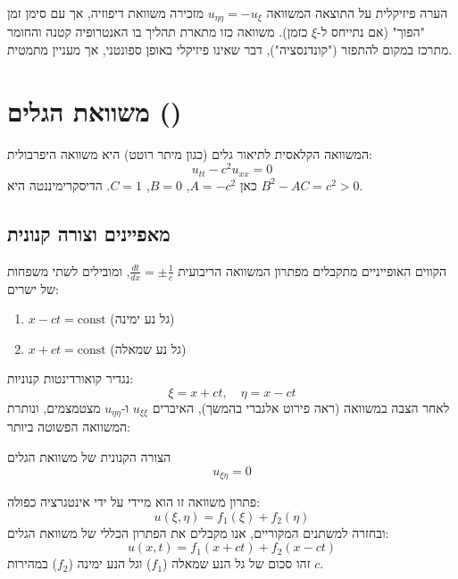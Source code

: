 \begin{notebox}{הערה פיזיקלית על התוצאה}
המשוואה $u_{\eta\eta} = -u_\xi$ מזכירה משוואת דיפוזיה, אך עם סימן זמן "הפוך" (אם נתייחס ל-$\xi$ כזמן). משוואה כזו מתארת תהליך בו האנטרופיה קטנה והחומר מתרכז במקום להתפזר ("קונדנסציה"), דבר שאינו פיזיקלי באופן ספונטני, אך מעניין מתמטית.
\end{notebox}

\section{משוואת הגלים ()}

המשוואה הקלאסית לתיאור גלים (כגון מיתר רוטט) היא משוואה היפרבולית:
$$ u_{tt} - c^2 u_{xx} = 0 $$
כאן $A = -c^2$, $B=0$, $C=1$. הדיסקרימיננטה היא $B^2 - AC = c^2 > 0$.

\subsection{מאפיינים וצורה קנונית}
הקווים האופייניים מתקבלים מפתרון המשוואה הריבועית $\frac{dt}{dx} = \pm \frac{1}{c}$, ומובילים לשתי משפחות של ישרים:
\begin{enumerate}
    \item $x - ct = \text{const}$ (גל נע ימינה)
    \item $x + ct = \text{const}$ (גל נע שמאלה)
\end{enumerate}

נגדיר קואורדינטות קנוניות:
$$ \xi = x + ct, \quad \eta = x - ct $$
לאחר הצבה במשוואה (ראה פירוט אלגברי בהמשך), האיברים $u_{\xi\xi}$ ו-$u_{\eta\eta}$ מצטמצמים, ונותרת המשוואה הפשוטה ביותר:
\begin{resultbox}{הצורה הקנונית של משוואת הגלים}
$$ u_{\xi\eta} = 0 $$
\end{resultbox}

פתרון משוואה זו הוא מיידי על ידי אינטגרציה כפולה:
$$ u(\xi, \eta) = f_1(\xi) + f_2(\eta) $$
ובחזרה למשתנים המקוריים, אנו מקבלים את הפתרון הכללי של משוואת הגלים:
$$ u(x,t) = f_1(x+ct) + f_2(x-ct) $$
זהו סכום של גל הנע שמאלה ($f_1$) וגל הנע ימינה ($f_2$) במהירות $c$.

